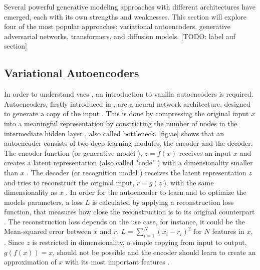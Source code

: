 Several powerful generative modeling approaches with different architectures have emerged, each with its own strengths and weaknesses. 
This section will explore four of the most popular approaches: variational autoencoders, generative adversarial networks, transformers, and diffusion models. [TODO: label auf section]

\subsection{Variational Autoencoders}
\label{ch:preliminaries-generativeAlgorithms-variationalAutoencoders} 

In order to understand \glspl{vae} \cite{kingma2013AutoEncodingVariationalBayes}, an introduction to vanilla autoencoders is required.
Autoencoders, firstly introduced in \cite{rumelhart1986LearningInternalRepresentations}, are a neural network architecture, designed to generate a copy of the input \cite{Goodfellow-et-al-2016, Bank2020Autoencoders}.
This is done by compressing the original input $x$ into a meaningful representation by constricting the number of nodes in the intermediate hidden layer \cite{aggarwal2018NeuralNetworksDeep, Bank2020Autoencoders}, also called bottleneck.
\autoref{fig:ae} shows that an autoencoder consists of two deep-learning modules, the encoder and the decoder.
The encoder function (or generative model \cite{kingma2019IntroductionVariationalAutoencoders}), $z=f(x)$ receives an input $x$ and creates a latent representation (also called "code" \cite{aggarwal2018NeuralNetworksDeep}) with a dimensionality smaller than $x$ \cite{Goodfellow-et-al-2016, Bank2020Autoencoders}.
The decoder (or recognition model \cite{kingma2019IntroductionVariationalAutoencoders}) receives the latent representation $z$ and tries to reconstruct the original input, $r=g(z)$ with the same dimensionality as $x$ \cite{Goodfellow-et-al-2016}.
In order for the autoencoder to learn and to optimize the models parameters, a loss $L$ is calculated by applying a reconstruction loss function, that measures how close the reconstruction is to its original counterpart \cite{Bank2020Autoencoders, maheshwari2022AutoencoderIssuesChallenges}.
The reconstruction loss depends on the use case, for instance, it could be the Mean-squared error between $x$ and $r$, $L=\sum_{i=1}^{N}(x_i-r_i)^2$ for $N$ features in $x$, \cite{aggarwal2018NeuralNetworksDeep, Goodfellow-et-al-2016}.
Since $z$ is restricted in dimensionality, a simple copying from input to output, \ie $g(f(x))=x$, should not be possible and the encoder should learn to create an approximation of $x$ with its most important features \cite{aggarwal2018NeuralNetworksDeep}.
